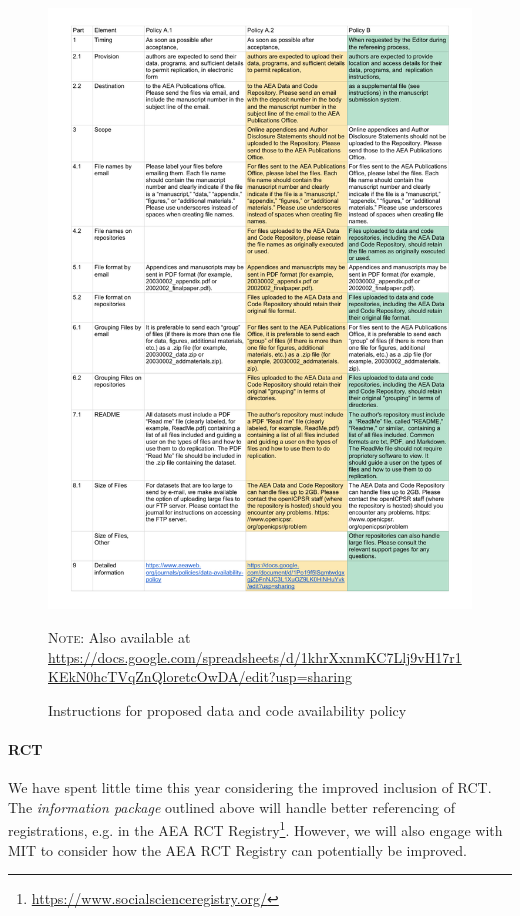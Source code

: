 \documentclass[AEJ]{AEA}
\newcommand{\urlcite}[2]{#2\footnote{\url{#1}}}
\begin{document}
\begin{figure}
	\includegraphics[width=\textwidth]{images/AEA_Data_and_Code_Availability_Policies_-_Instructions.pdf}
	\caption{Instructions for proposed data and code availability policy\label{fig:instructions}}
	
	\centering \footnotesize \textsc{Note:} Also available at \url{https://docs.google.com/spreadsheets/d/1khrXxnmKC7Llj9vH17r1KEkN0hcTVqZnQloretcOwDA/edit?usp=sharing}
\end{figure}

\paragraph{RCT}
We have spent little time this year considering the improved inclusion of \ac{RCT}. The \textit{information package} outlined above will handle better referencing of registrations, e.g. in the \urlcite{https://www.socialscienceregistry.org/}{AEA RCT Registry}. However, we will also engage with MIT to consider how the AEA RCT Registry can potentially be improved.
\end{document}
